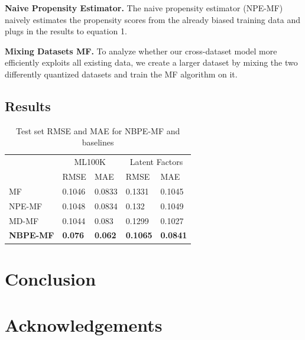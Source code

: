 \documentclass{article}
\begin{document}
\textbf{Naive Propensity Estimator.}
The naive propensity estimator (NPE-MF) naively estimates the propensity scores from the already biased training data and plugs in the results to equation 1.

\textbf{Mixing Datasets MF.}
To analyze whether our cross-dataset model more efficiently exploits all existing data, we create a larger dataset by mixing the two differently quantized datasets and train the MF algorithm on it.

\subsection{Results}

\begin{table}
  \caption{Test set RMSE and MAE for NBPE-MF and baselines}
  \label{sample-table}
  \centering
  \begin{tabular}{lllll}
    \toprule               
                     & \multicolumn{2}{c}{ML100K} & \multicolumn{2}{c}{Latent Factors}                                     \\
    \cmidrule(r){2-5}
                     & RMSE                       & MAE                                & RMSE            & MAE             \\
    \midrule
    MF               & 0.1046                     & 0.0833                             & 0.1331          & 0.1045          \\ 
    NPE-MF           & 0.1048                     & 0.0834                             & 0.132           & 0.1049          \\ 
    MD-MF            & 0.1044                     & 0.083                              & 0.1299          & 0.1027          \\
    \textbf{NBPE-MF} & \textbf{0.076}             & \textbf{0.062}                     & \textbf{0.1065} & \textbf{0.0841} \\ 
    \bottomrule
  \end{tabular}
\end{table}

\section{Conclusion}

\section*{Acknowledgements}



\end{document}
